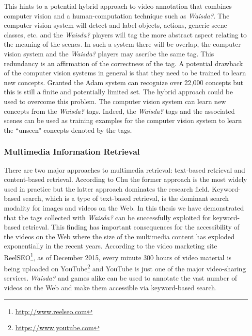 This hints to a potential hybrid approach to video annotation that combines computer vision and a human-computation technique such as \textit{Waisda?}. The computer vision system will detect and label objects, actions, generic scene classes, etc. and the \textit{Waisda?} players will tag the more abstract aspect relating to the meaning of the scenes. In such a system there will be overlap, the computer vision system and the \textit{Waisda?} players may ascribe the same tag. This redundancy is an affirmation of the correctness of the tag. A potential drawback of the computer vision systems in general is that they need to be trained to learn new concepts. Granted the Adam system can recognize over 22,000 concepts but this is still a finite and potentially limited set. The hybrid approach could be used to overcome this problem. The computer vision system can learn new concepts from the \textit{Waisda?} tags. Indeed, the \textit{Waisda?} tags and the associated scenes can be used as training examples for the computer vision system to learn the ``unseen" concepts denoted by the tags.

\subsubsection{Multimedia Information Retrieval}
There are two major approaches to multimedia retrieval: text-based retrieval and content-based retrieval. According to Chu \cite{journals/jasis/Chu01} the former approach is the most widely used in practice but the latter approach dominates the research field. Keyword-based search, which is a type of text-based retrieval, is the dominant search modality for images and videos on the Web. In this thesis we have demonstrated that the tags collected with \textit{Waisda?} can be successfully exploited for keyword-based retrieval. This finding has important consequences for the accessibility of the videos on the Web where the size of the multimedia content has exploded exponentially in the recent years. According to the video marketing site ReelSEO\footnote{\url{http://www.reelseo.com}}, as of December 2015, every minute 300 hours of video material is being uploaded on YouTube\footnote{\url{https://www.youtube.com}}\cite{reelseo} and YouTube is just one of the major video-sharing services. \textit{Waisda?} and games alike can be used to annotate the vast number of videos on the Web and make them accessible via keyword-based search.

